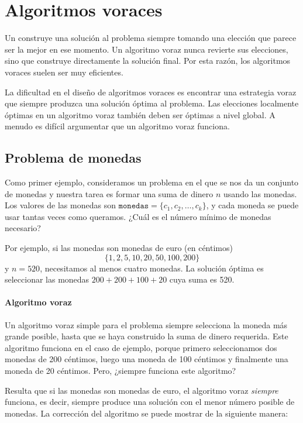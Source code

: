 \chapter{Algoritmos voraces}


Un 
construye una solución al problema
siempre tomando una elección que parece
ser la mejor en ese momento.
Un algoritmo voraz nunca revierte
sus elecciones, sino que construye directamente
la solución final.
Por esta razón, los algoritmos voraces
suelen ser muy eficientes.

La dificultad en el diseño de algoritmos voraces
es encontrar una estrategia voraz
que siempre produzca una solución óptima
al problema.
Las elecciones localmente óptimas en un algoritmo voraz
también deben ser óptimas a nivel global.
A menudo es difícil argumentar que
un algoritmo voraz funciona.

\section{Problema de monedas}

Como primer ejemplo, consideramos un problema
en el que se nos da un conjunto de monedas
y nuestra tarea es formar una suma de dinero $n$
usando las monedas.
Los valores de las monedas son
$\texttt{monedas}=\{c_1,c_2,\ldots,c_k\}$,
y cada moneda se puede usar tantas veces como queramos.
¿Cuál es el número mínimo de monedas necesario?

Por ejemplo, si las monedas son monedas de euro (en céntimos)
\[\{1,2,5,10,20,50,100,200\}\]
y $n=520$,
necesitamos al menos cuatro monedas.
La solución óptima es seleccionar las monedas
$200+200+100+20$ cuya suma es 520.

\subsubsection{Algoritmo voraz}

Un algoritmo voraz simple para el problema
siempre selecciona la moneda más grande posible,
hasta que se haya construido la suma de dinero requerida.
Este algoritmo funciona en el caso de ejemplo,
porque primero seleccionamos dos monedas de 200 céntimos,
luego una moneda de 100 céntimos y finalmente una moneda de 20 céntimos.
Pero, ¿siempre funciona este algoritmo?

Resulta que si las monedas son monedas de euro,
el algoritmo voraz \emph{siempre} funciona, es decir,
siempre produce una solución con el menor número
posible de monedas.
La corrección del algoritmo se puede
mostrar de la siguiente manera:


